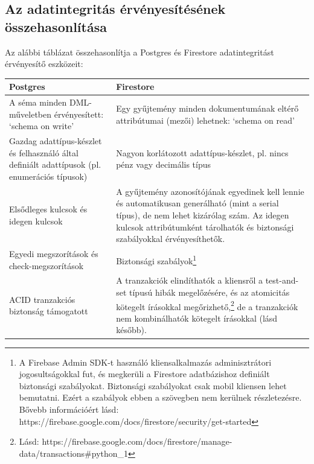 \documentclass[
  magyar,
]{article}
\begin{document}
\subsection{Az adatintegritás érvényesítésének
összehasonlítása}\label{az-adatintegrituxe1s-uxe9rvuxe9nyesuxedtuxe9suxe9nek-uxf6sszehasonluxedtuxe1sa}

Az alábbi táblázat összehasonlítja a Postgres és Firestore
adatintegritást érvényesítő eszközeit:

\begin{longtable}[]{@{}
  >{\raggedright\arraybackslash}p{}
  >{\raggedright\arraybackslash}p{}@{}}
\toprule\noalign{}
\begin{minipage}[b]{\linewidth}\raggedright
\textbf{Postgres}
\end{minipage} & \begin{minipage}[b]{\linewidth}\raggedright
\textbf{Firestore}
\end{minipage} \\
\midrule\noalign{}
\endhead
\bottomrule\noalign{}
\endlastfoot
A séma minden DML-műveletben érvényesített: `schema on write' & Egy
gyűjtemény minden dokumentumának eltérő attribútumai (mezői) lehetnek:
`schema on read' \\
Gazdag adattípus-készlet és felhasználó által definiált adattípusok (pl.
enumerációs típusok) & Nagyon korlátozott adattípus-készlet, pl. nincs
pénz vagy decimális típus \\
Elsődleges kulcsok és idegen kulcsok & A gyűjtemény azonosítójának
egyedinek kell lennie és automatikusan generálható (mint a serial
típus), de nem lehet kizárólag szám. Az idegen kulcsok attribútumként
tárolhatók és biztonsági szabályokkal érvényesíthetők. \\
Egyedi megszorítások és check-megszorítások & Biztonsági
szabályok\footnote{A Firebase Admin SDK-t használó kliensalkalmazás
  adminisztrátori jogosultságokkal fut, és megkerüli a Firestore
  adatbázishoz definiált biztonsági szabályokat. Biztonsági szabályokat
  csak mobil kliensen lehet bemutatni. Ezért a szabályok ebben a
  szövegben nem kerülnek részletezésre. Bővebb információért lásd:
  https://firebase.google.com/docs/firestore/security/get-started} \\
ACID tranzakciós biztonság támogatott & A tranzakciók elindíthatók a
kliensről a test-and-set típusú hibák megelőzésére, és az atomicitás
kötegelt írásokkal megőrizhető,\footnote{Lásd:
  https://firebase.google.com/docs/firestore/manage-data/transactions\#python\_1}
de a tranzakciók nem kombinálhatók kötegelt írásokkal (lásd később). \\
\end{longtable}
\end{document}
